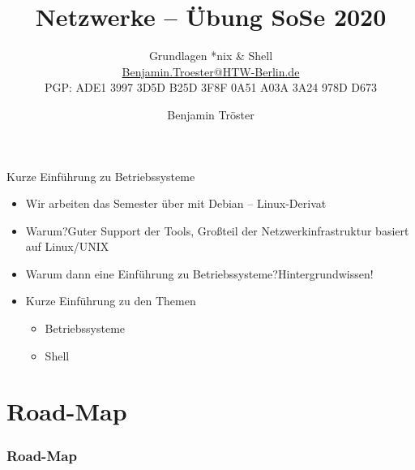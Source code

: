 \documentclass[xcolor=dvipsnames,aspectratio=169]{beamer}
\begin{document}

\title{Netzwerke -- Übung SoSe 2020}
\subtitle{Grundlagen *nix \& Shell\\
\href{mailto:Benjamin.Troester@HTW-Berlin.de}{Benjamin.Troester@HTW-Berlin.de}\\
		PGP: ADE1 3997 3D5D B25D 3F8F 0A51 A03A 3A24 978D D673 }

\author{Benjamin Tröster}

\date{}

\begin{frame}
\titlepage
\end{frame}

\begin{frame}{Kurze Einführung zu Betriebssysteme}
	\begin{itemize}
		\item Wir arbeiten das Semester über mit Debian -- Linux-Derivat
		\item Warum?\qquad Guter Support der Tools, Großteil der Netzwerkinfrastruktur basiert auf Linux/UNIX
		\item Warum dann eine Einführung zu Betriebssysteme?\qquad Hintergrundwissen!
		\item Kurze Einführung zu den Themen
		\begin{itemize}
			\item Betriebssysteme
			\item Shell
		\end{itemize}
	\end{itemize}
\end{frame}

\section*{Road-Map}
\begin{frame}
\frametitle{Road-Map}
\begin{multicols}{2}
  \tableofcontents
\end{multicols}
\end{frame}
\end{document}
